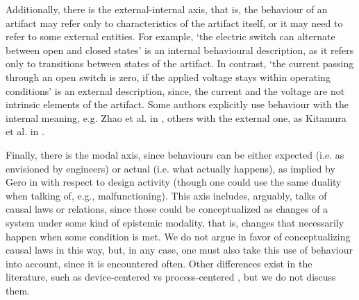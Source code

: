 \documentclass[sw]{iosart2x}
\newcommand{\TODO}[1]{{\color{red} #1
}}
\newcommand{\myComment}[1]{{\unskip \ignorespaces}}
\begin{document}
Additionally, there is the external-internal axis, that is, the behaviour of an artifact may refer only to characteristics of the artifact itself, or it may need to refer to some external entities.
For example, `the electric switch can alternate between open and closed states' is an internal behavioural description, as it refers only to transitions between states of the artifact.
In contrast, `the current passing through an open switch is zero, if the applied voltage stays within operating conditions' is an external description, since, the current and the voltage are not intrinsic elements of the artifact. %
Some authors explicitly use behaviour with the internal meaning, e.g. Zhao et al. in \cite{zhaoStateBehaviorFunction2019}, others with the external one, as Kitamura et al. in \cite{kitamuraOntologybasedSystematizationFunctional2004}.%

Finally, there is the modal axis, since \myComment{for \textcolor{blue}{(since? considering that?)}} behaviours can be \myComment{\textcolor{blue}{(either)}} either expected (i.e. as envisioned by engineers) or actual (i.e. what actually happens), as implied by Gero in \cite{geroSituatedFunctionBehaviour2004} with respect to design activity (though one could use the same duality when talking of, e.g., malfunctioning).
This axis includes, arguably, talks of causal laws or relations, since those could be conceptualized as changes of a system under some kind of epistemic modality, that is, changes that necessarily happen when some condition is met.
We do not argue in favor of conceptualizing causal laws in this way, but, in any case, one must also take this use of behaviour into account, since it is encountered often. %
Other differences exist in the literature, such as device-centered vs process-centered \cite{chandrasekaranFunctionDeviceRepresentation2000}, but we do not discuss them. 

\end{document}
